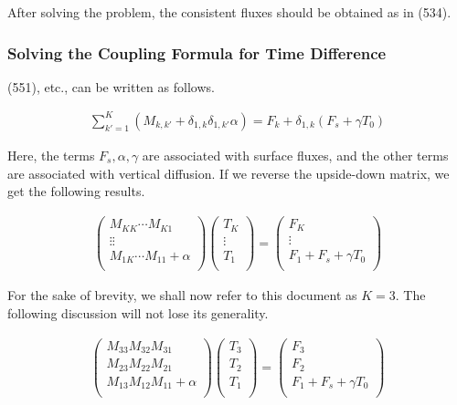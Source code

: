 After solving the problem, the consistent fluxes should be obtained as in (534).

\hypertarget{solving-the-coupling-formula-for-time-difference}{%
\subsubsection{Solving the Coupling Formula for Time Difference}\label{solving-the-coupling-formula-for-time-difference}}

(551), etc., can be written as follows.

\begin{eqnarray}
  \sum_{k'=1}^{K} ( M_{k,k'} + \delta_{1,k} \delta_{1,k'} \alpha)
    = F_k + \delta_{1,k} ( F_s + \gamma T_0 )
\end{eqnarray}

Here, the terms \(F_s, \alpha, \gamma\) are associated with surface fluxes, and the other terms are associated with vertical diffusion. If we reverse the upside-down matrix, we get the following
results.

\begin{eqnarray}
  \left( \begin{array}{lll} M_{KK}  \cdots  M_{K1} \\ \vdots
  \vdots \\ M_{1K}  \cdots  M_{11} + \alpha \\
\end{array}  \right)
\left( \begin{array}{l} T_K \\ \vdots \\ T_1 \\
\end{array}  \right)
= \left( \begin{array}{l} F_K \\ \vdots \\ F_1 + F_s + \gamma T_{0} \\
\end{array} \right)
\end{eqnarray}

For the sake of brevity, we shall now refer to this document as \(K=3\). The following discussion will not lose its generality.

\begin{eqnarray}
  \left( \begin{array}{lll} M_{33}  M_{32}  M_{31} \\ M_{23}
  M_{22}  M_{21} \\ M_{13}  M_{12}  M_{11} + \alpha \\
\end{array} \right)
\left( \begin{array}{l} T_3 \\ T_2 \\ T_1 \\
\end{array} \right)
= \left( \begin{array}{l} F_3 \\ F_2 \\ F_1 + F_s + \gamma T_{0} \\
\end{array} \right)
\end{eqnarray}

